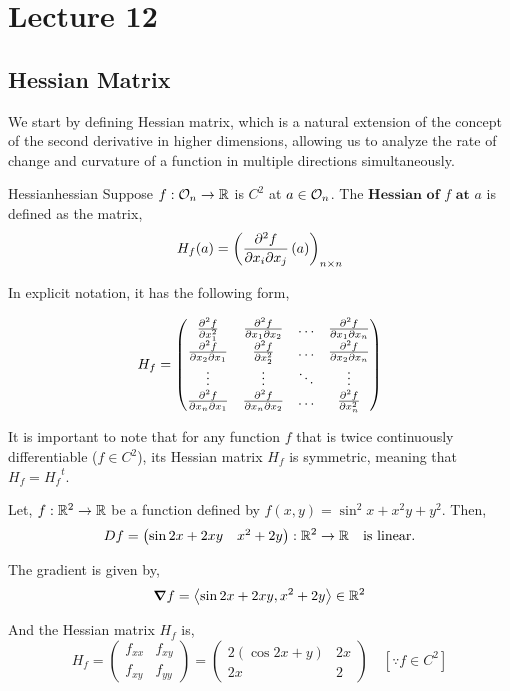 \documentclass[../Analysis-3.tex]{subfiles}
\begin{document}
\chapter*{Lecture 12} %
\setcounter{chapter}{12} %
\setcounter{section}{0}

\section{Hessian Matrix}

We start by defining Hessian matrix, which is a natural extension of the concept of the second derivative in higher dimensions, allowing us to analyze the rate of change and curvature of a function in multiple directions simultaneously.

\begin{Def}{Hessian}{hessian}
  Suppose $f : \mathcal{O}_{n} \to \mathbb{R}$ is $C^2$ at $a \in \mathcal{O}_{n} $. The $\textbf{Hessian of $f$ at $a$}$ is defined as the matrix,
  \[ H_f(a) = \left( \pdv{f}{x_i}{x_j}\left( a \right) \right)_{n \times n} \]
\end{Def}

In explicit notation, it has the following form,

\[ H_{f} = \begin{pmatrix}
    \pdv[2]{f}{x_1}   & \pdv{f}{x_1}{x_2} & \ldots & \pdv{f}{x_1}{x_n} \\
    \pdv{f}{x_2}{x_1} & \pdv[2]{f}{x_2}   & \ldots & \pdv{f}{x_2}{x_n} \\
    \vdots            & \vdots            & \ddots & \vdots            \\
    \pdv{f}{x_n}{x_1} & \pdv{f}{x_n}{x_2} & \ldots & \pdv[2]{f}{x_n}
  \end{pmatrix} \]

It is important to note that for any function $f$ that is twice continuously differentiable ($f \in C^2$), its Hessian matrix $H_f$ is symmetric, meaning that $H_f = {H_f}^t$.

\begin{Eg}{}{}
  Let, $f : \mathbb{R}^2 \to \mathbb{R}$ be a function defined by $f(x,y) = \sin^2 x + x^2y + y^2$. Then,
  \[  Df = \begin{pmatrix}
      \sin2x + 2xy & x^2 + 2y
    \end{pmatrix} :  \mathbb{R}^2 \to \mathbb{R} \quad \text{is linear.}  \]

  The gradient is given by, \[  \grad f = \left\langle \sin2x + 2xy, x^2 + 2y \right\rangle \in \mathbb{R}^2  \]

  And the Hessian matrix $H_f$ is,
  \[ H_f = \begin{pmatrix}
      f_{xx} & f_{xy} \\
      f_{xy} & f_{yy}
    \end{pmatrix} = \begin{pmatrix}
      2( \cos2x + y) & 2x \\
      2x             & 2
    \end{pmatrix} \quad \left[ \because  f \in C^2 \right] \]

\end{Eg}
\end{document}
